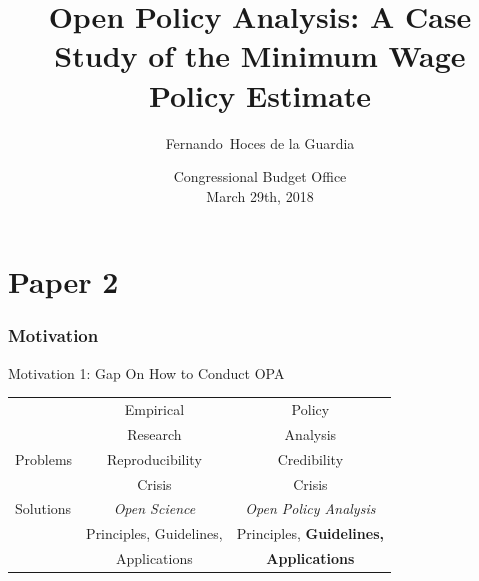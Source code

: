 \documentclass{beamer}
\def\white{\color{white}}
\begin{document}
\part{Paper 2}
\title[OPA - Minimum Wage ] %
{Open Policy Analysis: A Case Study of the Minimum Wage Policy Estimate}

\subtitle
{}

\author[] %
{Fernando~Hoces de la Guardia}


\date[] %
{Congressional Budget Office\\
March 29th, 2018}



\begin{frame}
  \titlepage
\end{frame}

\section{Motivation}

\begin{frame}[noframenumbering]{Motivation 1: Gap On How to Conduct OPA}
\begin{table}[ht]
\centering
\begin{tabular}[t]{|l|c|c|}
\hline
& Empirical  & Policy \\
& Research & Analysis \\

\hline
Problems & Reproducibility  &  Credibility \\
				 &  Crisis & Crisis \\
\hline
Solutions &  \textit{Open Science}&    \textit{Open Policy Analysis} \\
 & Principles, Guidelines,  &   Principles{\white, \textbf{Guidelines,}}\\
 & Applications &   {\white \textbf{Applications}}\\

\hline
\end{tabular}
\end{table}%
\end{frame}
\end{document}
